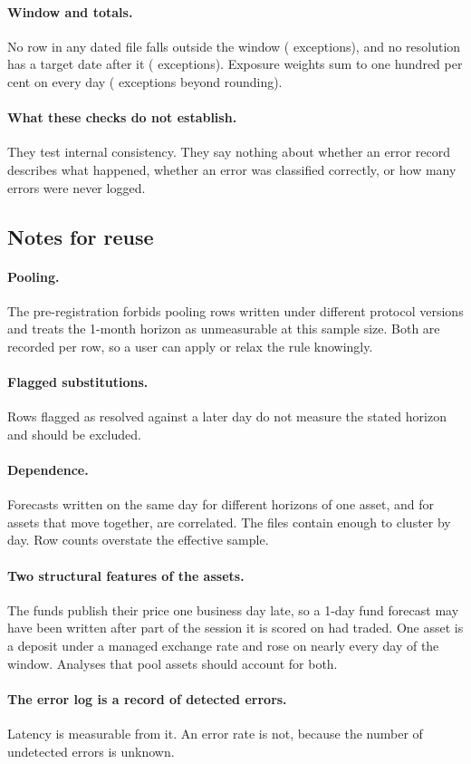 \documentclass[11pt,a4paper]{article}
\begin{document}
\paragraph{Window and totals.} No row in any dated file falls outside the
window (\VOutsideWindow{} exceptions), and no resolution has a target date
after it (\VTargetOutsideWindow{} exceptions). Exposure weights sum to one
hundred per cent on every day (\VExposureNotHundred{} exceptions beyond
rounding).

\paragraph{What these checks do not establish.} They test internal
consistency. They say nothing about whether an error record describes what
happened, whether an error was classified correctly, or how many errors were
never logged.

\subsection{Notes for reuse}\label{app:usage}

\paragraph{Pooling.} The pre-registration forbids pooling rows written under
different protocol versions and treats the 1-month horizon as unmeasurable at
this sample size. Both are recorded per row, so a user can apply or relax the
rule knowingly.

\paragraph{Flagged substitutions.} Rows flagged as resolved against a later
day do not measure the stated horizon and should be excluded.

\paragraph{Dependence.} Forecasts written on the same day for different
horizons of one asset, and for assets that move together, are correlated. The
files contain enough to cluster by day. Row counts overstate the effective
sample.

\paragraph{Two structural features of the assets.} The funds publish their
price one business day late, so a 1-day fund forecast may have been written
after part of the session it is scored on had traded. One asset is a deposit
under a managed exchange rate and rose on nearly every day of the window.
Analyses that pool assets should account for both.

\paragraph{The error log is a record of detected errors.} Latency is
measurable from it. An error rate is not, because the number of undetected
errors is unknown.



\end{document}

